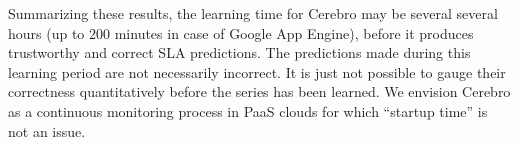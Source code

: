 
Summarizing these results, 
the learning time for Cerebro may be several
several hours (up to $200$ minutes in case of 
Google App Engine), before it produces trustworthy and correct 
SLA predictions.  The predictions made during this learning period are not
necessarily incorrect.  It is just not possible to gauge their correctness
quantitatively before the series has been learned.  We envision Cerebro as a
continuous monitoring process in PaaS clouds for which ``startup time'' is not 
an issue.
